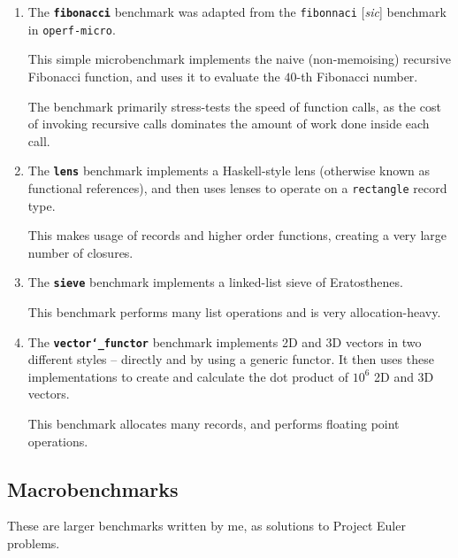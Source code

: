 \documentclass[12pt,a4paper,twoside,openright]{report}
\begin{document}
\begin{enumerate}

  \item
    The \textbf{\texttt{fibonacci}} benchmark was adapted from the \lstinline!fibonnaci!
[\textit{sic}] benchmark in \lstinline!operf-micro!.

This simple microbenchmark implements the naive (non-memoising) recursive
Fibonacci function, and uses it to evaluate the $40$-th Fibonacci number.

The benchmark primarily stress-tests the speed of function calls, as the cost
of invoking recursive calls dominates the amount of work done inside each call.

\item

  The \textbf{\texttt{lens}} benchmark implements a Haskell-style lens (otherwise known as
functional references), and then uses lenses to operate on a
\lstinline!rectangle! record type.

This makes usage of records and higher order functions, creating a very large
number of closures.

\item

  The \textbf{\texttt{sieve}} benchmark implements a linked-list sieve of Eratosthenes.

This benchmark performs many list operations and is very allocation-heavy.

\item

  The \textbf{\texttt{vector\char`_functor}} benchmark implements 2D and 3D vectors in two
different styles -- directly and by using a generic functor. It then uses these
implementations to create and calculate the dot product of $10^6$ 2D and 3D
vectors.

This benchmark allocates many records, and performs floating point operations.
\end{enumerate}

\subsection{Macrobenchmarks}
These are larger benchmarks written by me, as solutions to Project Euler problems.
\end{document}

